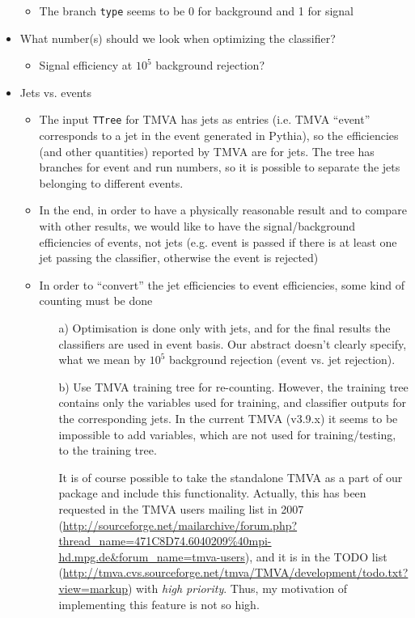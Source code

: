 \begin{itemize}
\begin{itemize}
  \item The branch \texttt{type} seems to be 0 for background and 1 for signal
  \end{itemize}
\item What number(s) should we look when optimizing the classifier?
  \begin{itemize}
  \item Signal efficiency at $10^5$ background rejection?
  \end{itemize}
\item Jets vs. events
  \begin{itemize}
  \item The input \texttt{TTree} for TMVA has jets as entries (i.e.
    TMVA ``event'' corresponds to a jet in the event generated in
    Pythia), so the efficiencies (and other quantities) reported by
    TMVA are for jets. The tree has branches for event and run
    numbers, so it is possible to separate the jets belonging to
    different events.
  \item In the end, in order to have a physically reasonable result
    and to compare with other results, we would like to have the
    signal/background efficiencies of events, not jets (e.g. event is
    passed if there is at least one jet passing the classifier,
    otherwise the event is rejected)
  \item In order to ``convert'' the jet efficiencies to event
    efficiencies, some kind of counting must be done
    \begin{enumerate}
    \item[a)] Optimisation is done only with jets, and for the final
      results the classifiers are used in event basis. Our abstract
      doesn't clearly specify, what we mean by $10^5$ background
      rejection (event vs. jet rejection). 

    \item[b)] Use TMVA training tree for re-counting. However, the
      training tree contains only the variables used for training, and
      classifier outputs for the corresponding jets. In the current
      TMVA (v3.9.x) it seems to be impossible to add variables, which
      are not used for training/testing, to the training tree.

      It is of course possible to take the standalone TMVA as a part
      of our package and include this functionality. Actually, this
      has been requested in the TMVA users mailing list in 2007
      (\url{http://sourceforge.net/mailarchive/forum.php?thread_name=471C8D74.6040209\%40mpi-hd.mpg.de\&forum_name=tmva-users}),
      and it is in the TODO list
      (\url{http://tmva.cvs.sourceforge.net/tmva/TMVA/development/todo.txt?view=markup})
      with \emph{high priority}. Thus, my motivation of implementing
      this feature is not so high.


\end{enumerate}
\end{itemize}
\end{itemize}
